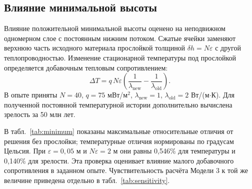 \subsection{Влияние минимальной высоты}

Влияние положительной минимальной высоты оценено на неподвижном
одномерном слое с постоянным нижним потоком.
Сжатые ячейки заменяют верхнюю часть исходного материала прослойкой
толщиной $\delta h=N\varepsilon$ с другой теплопроводностью.
Изменение стационарной температуры под прослойкой определяется
добавочным тепловым сопротивлением:
\begin{equation}
 \Delta T=q\,N\varepsilon
 \left(\frac{1}{\lambda_{\mathrm{new}}}
             -\frac{1}{\lambda_{\mathrm{old}}}\right).
\end{equation}
В опыте приняты $N=40$, $q=75$ мВт/м$^2$,
$\lambda_{\mathrm{new}}=1$, $\lambda_{\mathrm{old}}=2$
Вт/(м$\cdot$К). Для полученной постоянной температурной истории
дополнительно вычислена зрелость за 50 млн лет.

В табл.~\ref{tab:minimum} показаны максимальные относительные
отличия от решения без прослойки; температурные отличия нормированы
по градусам Цельсия. При $\varepsilon=0{,}05$ м и
$N\varepsilon=2$ м они равны 0,546\% для температуры
и 0,140\% для зрелости. Эта проверка оценивает влияние малого
добавочного сопротивления в заданном опыте. Чувствительность
расчёта Модели 3 к той же величине приведена отдельно
в табл.~\ref{tab:sensitivity}.



